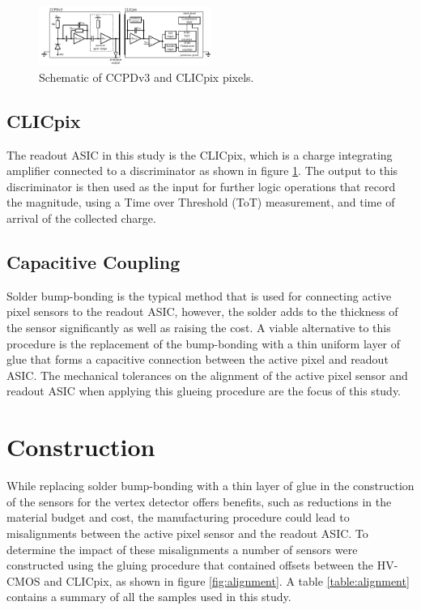 \begin{figure}
\centering
\includegraphics[width=0.5\textwidth]{CLICdpVertex/Plots/schematic.pdf}
\caption[Schematic of CCPDv3 and CLICpix pixels.]{Schematic of CCPDv3 and CLICpix pixels.}
\label{fig:ccpdandclicpix}
\end{figure}

\subsection{CLICpix}
The readout ASIC in this study is the CLICpix, which is a charge integrating amplifier connected to a discriminator as shown in figure \ref{fig:ccpdandclicpix}.  The output to this discriminator is then used as the input for further logic operations that record the magnitude, using a Time over Threshold (ToT) measurement, and time of arrival of the collected charge.

\subsection{Capacitive Coupling}
Solder bump-bonding is the typical method that is used for connecting active pixel sensors to the readout ASIC, however, the solder adds to the thickness of the sensor significantly as well as raising the cost.  A viable alternative to this procedure is the replacement of the bump-bonding with a thin uniform layer of glue that forms a capacitive connection between the active pixel and readout ASIC.  The mechanical tolerances on the alignment of the active pixel sensor and readout ASIC when applying this glueing procedure are the focus of this study.  

\section{Construction}
While replacing solder bump-bonding with a thin layer of glue in the construction of the sensors for the vertex detector offers benefits, such as reductions in the material budget and cost, the manufacturing procedure could lead to misalignments between the active pixel sensor and the readout ASIC.  To determine the impact of these misalignments a number of sensors were constructed using the gluing procedure that contained offsets between the HV-CMOS and CLICpix, as shown in figure \ref{fig:alignment}.  A table \ref{table:alignment} contains a summary of all the samples used in this study.

